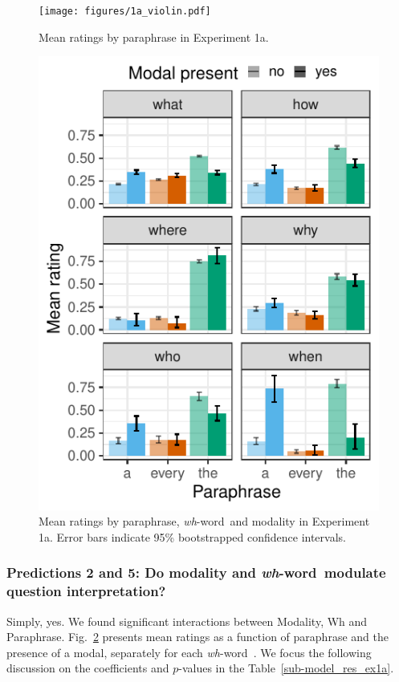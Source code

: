 \documentclass[12pt,letterpaper,table,svgnames,dvipsnames]{article}
\newcommand{\tableref}[1]{Table~\ref{#1}}
\newcommand{\figref}[1]{Fig.~\ref{#1}}
\newcommand{\whw}{\emph{wh}-word~}
\begin{document}
\begin{figure}[h!]
\centering
\texttt{[image: figures/1a\_violin.pdf]}
\caption{Mean ratings by paraphrase in Experiment 1a.}
\label{ex1a_violin}
\end{figure}


\begin{figure}[h!]
\centering
\includegraphics[scale=1]{figures/modxwh_rq_context.pdf}
\caption{Mean ratings by paraphrase, \whw and modality in Experiment 1a. Error bars indicate 95\% bootstrapped confidence intervals.} 
\label{ex1a_modXwh}
\end{figure}


\subsubsection{Predictions 2 and 5: Do modality and \whw modulate question interpretation?} 
Simply, yes. We found significant interactions between Modality, Wh and Paraphrase. \figref{ex1a_modXwh} presents mean ratings as a function of paraphrase and the presence of a modal, separately for each \whw. We focus the following discussion on the coefficients and $p$-values in the \tableref{sub-model_res_ex1a}.
\end{document}
